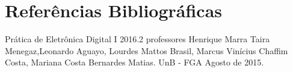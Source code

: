 \documentclass[12pts]{article}
\begin{document}
\section{Referências Bibliográficas}
\iffalse
Referencias Bibliográficas, relacionadas e citadas de acordo com as normas da ABNT.
\fi
Prática de Eletrônica Digital I 2016.2 professores Henrique Marra Taira Menegaz,Leonardo Aguayo, Lourdes Mattos Brasil, Marcus Vinícius Chaffim Costa, Mariana Costa Bernardes Matias. UnB - FGA Agosto de 2015.

\iffalse
\section{Diagramas Esquemáticos}
Diagramas Esquemáticos. Todos os diagramas devem ser inseridos ao final do relatório em páginas separadas do texto, indicando a identificação do circuito, autor, revisor, versão e datas relevantes.
\fi
\newpage
\end{document}
